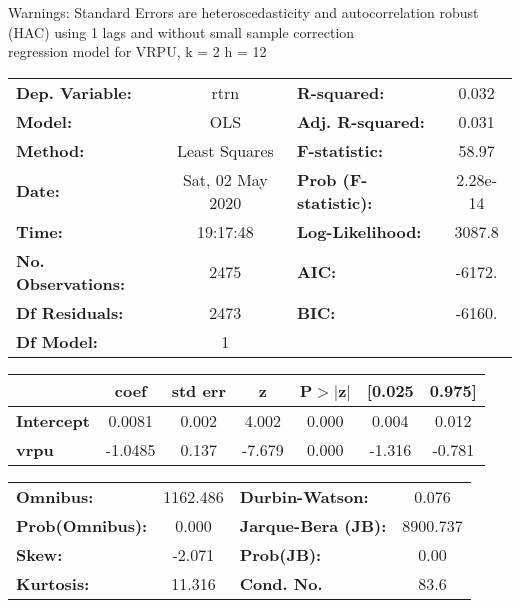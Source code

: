 Warnings: \newline
 [1] Standard Errors are heteroscedasticity and autocorrelation robust (HAC) using 1 lags and without small sample correction\\ 

regression model for VRPU, k = 2 h = 12\begin{center}
\begin{tabular}{lclc}
\toprule
\textbf{Dep. Variable:}    &       rtrn       & \textbf{  R-squared:         } &     0.032   \\
\textbf{Model:}            &       OLS        & \textbf{  Adj. R-squared:    } &     0.031   \\
\textbf{Method:}           &  Least Squares   & \textbf{  F-statistic:       } &     58.97   \\
\textbf{Date:}             & Sat, 02 May 2020 & \textbf{  Prob (F-statistic):} &  2.28e-14   \\
\textbf{Time:}             &     19:17:48     & \textbf{  Log-Likelihood:    } &    3087.8   \\
\textbf{No. Observations:} &        2475      & \textbf{  AIC:               } &    -6172.   \\
\textbf{Df Residuals:}     &        2473      & \textbf{  BIC:               } &    -6160.   \\
\textbf{Df Model:}         &           1      & \textbf{                     } &             \\
\bottomrule
\end{tabular}
\begin{tabular}{lcccccc}
                   & \textbf{coef} & \textbf{std err} & \textbf{z} & \textbf{P$> |$z$|$} & \textbf{[0.025} & \textbf{0.975]}  \\
\midrule
\textbf{Intercept} &       0.0081  &        0.002     &     4.002  &         0.000        &        0.004    &        0.012     \\
\textbf{vrpu}      &      -1.0485  &        0.137     &    -7.679  &         0.000        &       -1.316    &       -0.781     \\
\bottomrule
\end{tabular}
\begin{tabular}{lclc}
\textbf{Omnibus:}       & 1162.486 & \textbf{  Durbin-Watson:     } &    0.076  \\
\textbf{Prob(Omnibus):} &   0.000  & \textbf{  Jarque-Bera (JB):  } & 8900.737  \\
\textbf{Skew:}          &  -2.071  & \textbf{  Prob(JB):          } &     0.00  \\
\textbf{Kurtosis:}      &  11.316  & \textbf{  Cond. No.          } &     83.6  \\
\bottomrule
\end{tabular}
\end{center}

